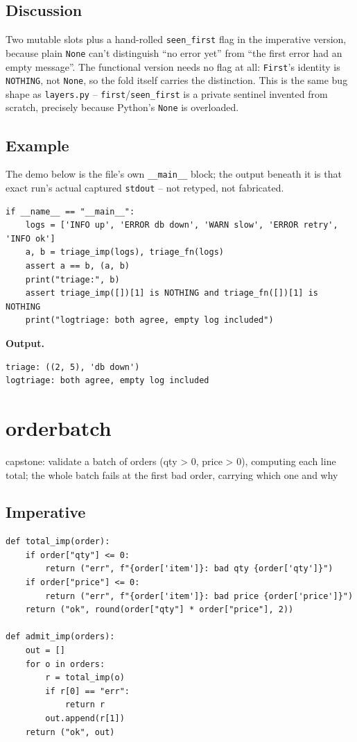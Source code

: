 \documentclass[10pt,letterpaper]{book}
\begin{document}
\section*{Discussion}

Two mutable slots plus a hand-rolled \texttt{seen\_first} flag in the
imperative version, because plain \texttt{None} can't distinguish ``no
error yet'' from ``the first error had an empty message''. The functional
version needs no flag at all: \texttt{First}'s identity is
\texttt{NOTHING}, not \texttt{None}, so the fold itself carries the
distinction. This is the same bug shape as \texttt{layers.py} --
\texttt{first}/\texttt{seen\_first} is a private sentinel invented from
scratch, precisely because Python's \texttt{None} is overloaded.

\section*{Example}
The demo below is the file's own \texttt{\_\_main\_\_} block; the output beneath it is that exact run's actual captured \texttt{stdout} -- not retyped, not fabricated.
\begin{lstlisting}[style=code]
if __name__ == "__main__":
    logs = ['INFO up', 'ERROR db down', 'WARN slow', 'ERROR retry', 'INFO ok']
    a, b = triage_imp(logs), triage_fn(logs)
    assert a == b, (a, b)
    print("triage:", b)
    assert triage_imp([])[1] is NOTHING and triage_fn([])[1] is NOTHING
    print("logtriage: both agree, empty log included")
\end{lstlisting}
\noindent\textbf{Output.}
\begin{lstlisting}[style=ex]
triage: ((2, 5), 'db down')
logtriage: both agree, empty log included
\end{lstlisting}
\chapter{orderbatch}
capstone: validate a batch of orders (qty > 0, price > 0), computing each line total; the whole batch fails at the first bad order, carrying which one and why

\section*{Imperative}
\begin{lstlisting}[style=code]
def total_imp(order):
    if order["qty"] <= 0:
        return ("err", f"{order['item']}: bad qty {order['qty']}")
    if order["price"] <= 0:
        return ("err", f"{order['item']}: bad price {order['price']}")
    return ("ok", round(order["qty"] * order["price"], 2))

def admit_imp(orders):
    out = []
    for o in orders:
        r = total_imp(o)
        if r[0] == "err":
            return r
        out.append(r[1])
    return ("ok", out)
\end{lstlisting}
\end{document}
